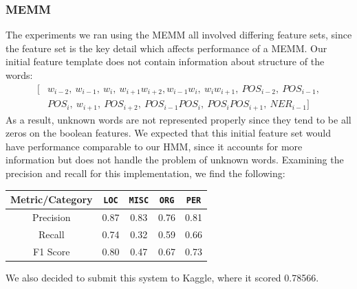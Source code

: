 \documentclass[12pt]{article}
\begin{document}
\subsubsection{MEMM}
The experiments we ran using the MEMM all involved differing feature sets, since the feature set is the key detail which affects performance of a MEMM. Our initial feature template does not contain information about structure of the words: 
\begin{equation*}
\begin{split}
[&w_{i - 2},\ w_{i - 1},\ w_i,\ w_{i + 1}w_{i + 2},
w_{i - 1}w_i,\ w_iw_{i + 1},\ POS_{i - 2},\ POS_{i - 1},\\
&POS_i,\ w_{i + 1},\ POS_{i + 2}, \ POS_{i - 1}POS_i,\ POS_iPOS_{i + 1},\ NER_{i - 1}
]
\end{split}
\end{equation*}
As a result, unknown words are not represented properly since they tend to be all zeros on the boolean features. We expected that this initial feature set would have performance comparable to our HMM, since it accounts for more information but does not handle the problem of unknown words. Examining the precision and recall for this implementation, we find the following:
\begin{center}
	\begin{tabular}{|c|c|c|c|c|}
		\hline
		\textbf{Metric/Category} & {\tt LOC} & {\tt MISC} & {\tt ORG} & {\tt PER}\\
		\hline
		Precision & 0.87 & 0.83 & 0.76 & 0.81\\
		\hline
		Recall & 0.74 & 0.32 & 0.59 & 0.66\\
		\hline
		F1 Score & 0.80 & 0.47 & 0.67 & 0.73\\
		\hline
	\end{tabular}
\end{center}
We also decided to submit this system to Kaggle, where it scored 0.78566. 
\end{document}
